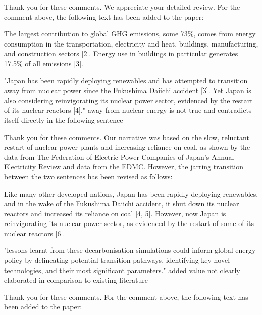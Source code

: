 \documentclass[answers,11pt]{exam}
\begin{document}
\begin{questions}
        \begin{solution}
                Thank you for these comments. We appreciate your detailed review. For the comment above, the following text has been added to the paper:
                
                The largest contribution to global \gls{GHG} emissions, some 73\%, comes from energy consumption in the transportation, electricity and heat, buildings, manufacturing, and construction sectors [2]. Energy use in buildings in particular generates 17.5\% of all emissions [3].
        \end{solution}

        
         \question "Japan has been rapidly deploying renewables and has attempted to transition away from nuclear power since the Fukushima Daiichi accident [3]. Yet Japan is also considering reinvigorating its nuclear power sector, evidenced by the restart of its nuclear reactors [4]."
 away from nuclear energy is not true and contradicts itself directly in the following sentence
        
        \begin{solution}
                Thank you for these comments.  Our narrative was based on the slow, reluctant restart of nuclear power plants and increasing reliance on coal, as shown by the data from The Federation of Electric Power Companies of Japan's Annual Electricity Review and data from the EDMC. However, the jarring transition between the two sentences has been revised as follows:
                
                Like many other developed nations, Japan has been rapidly deploying renewables, and in the wake of the Fukushima Daiichi accident, it shut down its nuclear reactors and increased its reliance on coal [4, 5]. However, now Japan is reinvigorating its nuclear power sector, as evidenced by the restart of some of its nuclear reactors [6].
                
        \end{solution}
        

         \question "lessons learnt from these decarbonisation simulations could inform global energy policy by delineating potential transition pathways, identifying key novel technologies, and their most significant parameters."
	added value not clearly elaborated in comparison to existing literature        
        \begin{solution}
                Thank you for these comments. For the comment above, the following text has been added to the paper:
                

\end{solution}
\end{questions}
\end{document}
